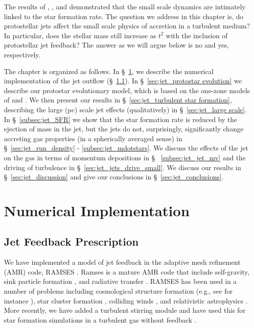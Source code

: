 \documentclass[../dissertation.tex]{subfiles}
\begin{document}
The results of \citet{2015ApJ...800...49L}, \citet{2015ApJ...804...44M}, and \citet{2017MNRAS.465.1316M} demonstrated that the small scale dynamics are intimately linked to the star formation rate. 
The question we address in this chapter is, do protostellar jets affect the small scale physics of accretion in a turbulent medium? 
In particular, does the stellar mass still increase as $t^2$ with the inclusion of protostellar jet feedback? 
The answer as we will argue below is no and yes, respectively.

The chapter is organized as follows.
In \S~\ref{sec:jet_implementation}, we describe the numerical implementation of the jet outflow (\S~\ref{sec:jet_jet feedback}).
In \S~\ref{sec:jet_protostar evolution} we describe our protostar evolutionary model, which is based on the one-zone models of \citet{2000ApJ...534..976N} and \citet{2009ApJ...703..131O}.
%
We then present our results in \S~\ref{sec:jet_turbulent star formation}, describing the large (pc) scale jet effects (qualitatively) in \S~\ref{sec:jet_large scale}.
In \S~\ref{subsec:jet_SFR} we show that the star formation rate is reduced by the ejection of mass in the jet, but the jets do not, surprisingly, significantly change accreting gas properties (in a spherically averaged sense) in \S ~\ref{sec:jet_run_density} - \ref{subsec:jet_mdotstars}.
We discuss the effects of the jet on the gas in terms of momentum depositions in  \S~ \ref{subsec:jet_jet_mv} and the driving of turbulence in \S~\ref{sec:jet_jets_drive_small}.
We discuss our results in \S~\ref{sec:jet_discussion} and give our conclusions in \S~\ref{sec:jet_conclusions}.

\section{Numerical Implementation}\label{sec:jet_implementation}

\subsection{Jet Feedback Prescription}\label{sec:jet_jet feedback}

We have implemented a model of jet feedback in the adaptive mesh refinement (AMR) code, RAMSES
 \citep{2002A&A...385..337T}.  Ramses is a mature AMR code that include self-gravity, sink particle formation \citep{2010MNRAS.409..985D,2014MNRAS.445.4015B}, and radiative transfer \citep{2013MNRAS.436.2188R,2015MNRAS.449.4380R}.  RAMSES has been used in a number of problems including cosmological structure formation (e.g., see for instance \citealt{2016MNRAS.463.1462O}), star cluster formation \citep{2017MNRAS.472.4155G}, %
colliding winds \citep{2011MNRAS.418.2618L,2017MNRAS.468.2655L}, and relativistic astrophysics \citep{2013A&A...560A..79L,2018MNRAS.474.2813L}. More recently, we have added a turbulent stirring module and have used this for star formation simulations in a turbulent gas without feedback \citep{2017MNRAS.465.1316M}.
\end{document}
